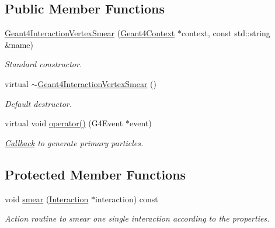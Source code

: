\subsection*{Public Member Functions}
\begin{DoxyCompactItemize}
\item 
\hyperlink{class_d_d4hep_1_1_simulation_1_1_geant4_interaction_vertex_smear_ad9e83f372fc7dc142f60a709e863d605}{Geant4InteractionVertexSmear} (\hyperlink{class_d_d4hep_1_1_simulation_1_1_geant4_context}{Geant4Context} $\ast$context, const std::string \&name)
\begin{DoxyCompactList}\small\item\em Standard constructor. \item\end{DoxyCompactList}\item 
virtual \hyperlink{class_d_d4hep_1_1_simulation_1_1_geant4_interaction_vertex_smear_aca69c6fbcb40dc0bcb6cd044906e5028}{$\sim$Geant4InteractionVertexSmear} ()
\begin{DoxyCompactList}\small\item\em Default destructor. \item\end{DoxyCompactList}\item 
virtual void \hyperlink{class_d_d4hep_1_1_simulation_1_1_geant4_interaction_vertex_smear_ada2914ca2a761ff0e1ccbbcc8bef578e}{operator()} (G4Event $\ast$event)
\begin{DoxyCompactList}\small\item\em \hyperlink{class_d_d4hep_1_1_callback}{Callback} to generate primary particles. \item\end{DoxyCompactList}\end{DoxyCompactItemize}
\subsection*{Protected Member Functions}
\begin{DoxyCompactItemize}
\item 
void \hyperlink{class_d_d4hep_1_1_simulation_1_1_geant4_interaction_vertex_smear_add129fed64f2f13270c5e8ac99cfe73b}{smear} (\hyperlink{class_d_d4hep_1_1_simulation_1_1_geant4_primary_interaction}{Interaction} $\ast$interaction) const 
\begin{DoxyCompactList}\small\item\em Action routine to smear one single interaction according to the properties. \item\end{DoxyCompactList}\end{DoxyCompactItemize}
